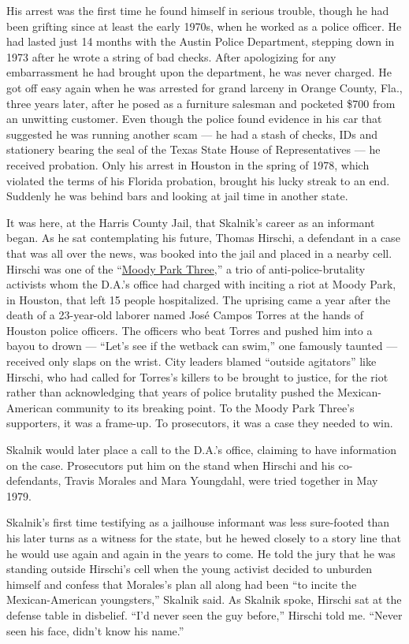 His arrest was the first time he found himself in serious trouble,
though he had been grifting since at least the early 1970s, when he
worked as a police officer. He had lasted just 14 months with the Austin
Police Department, stepping down in 1973 after he wrote a string of bad
checks. After apologizing for any embarrassment he had brought upon the
department, he was never charged. He got off easy again when he was
arrested for grand larceny in Orange County, Fla., three years later,
after he posed as a furniture salesman and pocketed \$700 from an
unwitting customer. Even though the police found evidence in his car
that suggested he was running another scam --- he had a stash of checks,
IDs and stationery bearing the seal of the Texas State House of
Representatives --- he received probation. Only his arrest in Houston in
the spring of 1978, which violated the terms of his Florida probation,
brought his lucky streak to an end. Suddenly he was behind bars and
looking at jail time in another state.

It was here, at the Harris County Jail, that Skalnik's career as an
informant began. As he sat contemplating his future, Thomas Hirschi, a
defendant in a case that was all over the news, was booked into the jail
and placed in a nearby cell. Hirschi was one of the
``\href{https://www.latinousa.org/2016/10/21/remembering-moody-park-death-sparked-houston-riot/}{Moody
Park Three},'' a trio of anti-police-brutality activists whom the D.A.'s
office had charged with inciting a riot at Moody Park, in Houston, that
left 15 people hospitalized. The uprising came a year after the death of
a 23-year-old laborer named José Campos Torres at the hands of Houston
police officers. The officers who beat Torres and pushed him into a
bayou to drown --- ``Let's see if the wetback can swim,'' one famously
taunted --- received only slaps on the wrist. City leaders blamed
``outside agitators'' like Hirschi, who had called for Torres's killers
to be brought to justice, for the riot rather than acknowledging that
years of police brutality pushed the Mexican-American community to its
breaking point. To the Moody Park Three's supporters, it was a frame-up.
To prosecutors, it was a case they needed to win.

Skalnik would later place a call to the D.A.'s office, claiming to have
information on the case. Prosecutors put him on the stand when Hirschi
and his co-defendants, Travis Morales and Mara Youngdahl, were tried
together in May 1979.

Skalnik's first time testifying as a jailhouse informant was less
sure-footed than his later turns as a witness for the state, but he
hewed closely to a story line that he would use again and again in the
years to come. He told the jury that he was standing outside Hirschi's
cell when the young activist decided to unburden himself and confess
that Morales's plan all along had been ``to incite the Mexican-American
youngsters,'' Skalnik said. As Skalnik spoke, Hirschi sat at the defense
table in disbelief. ``I'd never seen the guy before,'' Hirschi told me.
``Never seen his face, didn't know his name.''

